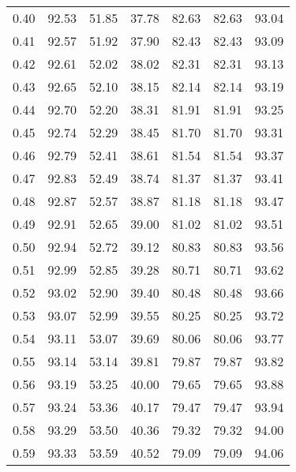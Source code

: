 \begin{tabular}{|c|c|c|c|c|c|c|}
      0.40 &     92.53 &     51.85 &      37.78 &   82.63 &      82.63 &         93.04 \\
      0.41 &     92.57 &     51.92 &      37.90 &   82.43 &      82.43 &         93.09 \\
      0.42 &     92.61 &     52.02 &      38.02 &   82.31 &      82.31 &         93.13 \\
      0.43 &     92.65 &     52.10 &      38.15 &   82.14 &      82.14 &         93.19 \\
      0.44 &     92.70 &     52.20 &      38.31 &   81.91 &      81.91 &         93.25 \\
      0.45 &     92.74 &     52.29 &      38.45 &   81.70 &      81.70 &         93.31 \\
      0.46 &     92.79 &     52.41 &      38.61 &   81.54 &      81.54 &         93.37 \\
      0.47 &     92.83 &     52.49 &      38.74 &   81.37 &      81.37 &         93.41 \\
      0.48 &     92.87 &     52.57 &      38.87 &   81.18 &      81.18 &         93.47 \\
      0.49 &     92.91 &     52.65 &      39.00 &   81.02 &      81.02 &         93.51 \\
      0.50 &     92.94 &     52.72 &      39.12 &   80.83 &      80.83 &         93.56 \\
      0.51 &     92.99 &     52.85 &      39.28 &   80.71 &      80.71 &         93.62 \\
      0.52 &     93.02 &     52.90 &      39.40 &   80.48 &      80.48 &         93.66 \\
      0.53 &     93.07 &     52.99 &      39.55 &   80.25 &      80.25 &         93.72 \\
      0.54 &     93.11 &     53.07 &      39.69 &   80.06 &      80.06 &         93.77 \\
      0.55 &     93.14 &     53.14 &      39.81 &   79.87 &      79.87 &         93.82 \\
      0.56 &     93.19 &     53.25 &      40.00 &   79.65 &      79.65 &         93.88 \\
      0.57 &     93.24 &     53.36 &      40.17 &   79.47 &      79.47 &         93.94 \\
      0.58 &     93.29 &     53.50 &      40.36 &   79.32 &      79.32 &         94.00 \\
      0.59 &     93.33 &     53.59 &      40.52 &   79.09 &      79.09 &         94.06 \\

\end{tabular}

